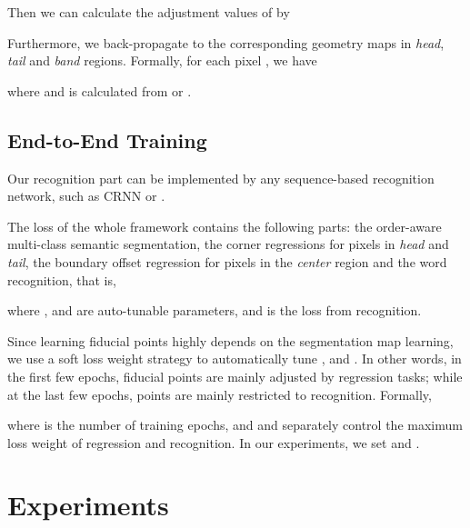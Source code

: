 \documentclass[letterpaper]{article} \usepackage{aaai20}  \usepackage{times}  \usepackage{helvet} \usepackage{courier}  \usepackage[hyphens]{url}  \usepackage{graphicx} \urlstyle{rm} \def\UrlFont{\rm}  \usepackage{graphicx}  \frenchspacing  \setlength{\pdfpagewidth}{8.5in}  \setlength{\pdfpageheight}{11in}  \usepackage{amsmath}
\begin{document}
Then we can calculate the adjustment values of  by

Furthermore, we back-propagate  to the corresponding geometry maps in \emph{head}, \emph{tail} and \emph{band} regions.
Formally, for each pixel , we have

where  and  is calculated from  or .


\subsection{End-to-End Training}
Our recognition part can be implemented by any sequence-based recognition network, such as CRNN \cite{shi2017end} or \cite{cheng2017focus}.

The loss of the whole framework contains the following parts: the order-aware multi-class semantic segmentation, the corner regressions for pixels in \emph{head} and \emph{tail}, the boundary offset regression for pixels in the \emph{center} region and the word recognition, that is,

where ,  and  are auto-tunable parameters, and  is the loss from recognition.

Since learning fiducial points highly depends on the segmentation map learning, we use a soft loss weight strategy to automatically tune ,  and .
In other words, in the first few epochs, fiducial points are mainly adjusted by regression tasks; while at the last few epochs, points are mainly restricted to recognition.
Formally,


where  is the number of training epochs, and  and  separately control the maximum loss weight of regression and recognition.
In our experiments, we set  and .

\section{Experiments}
\end{document}
